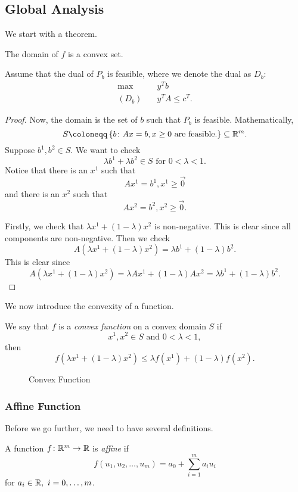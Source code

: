 \subsection{Global Analysis}
We start with a theorem.
\begin{theorem}
	The domain of \(f\) is a convex set.
\end{theorem}
Assume that the dual of \(P_b\) is feasible, where we denote the dual as \(D_b\):
\begin{align*}
	\max~      & y^{T}b            \\
	(D_b)\quad & y^{T}A\leq c^{T}.
\end{align*}

\begin{proof}
	Now, the domain is the set of \(b\) such that \(P_b\) is feasible. Mathematically,
	\[
		S\coloneqq \left\{ b\colon Ax = b, x\geq 0 \text{ are feasible.}\right\}\subseteq \mathbb{\MakeUppercase{R}}^m.
	\]
	Suppose \(b^1, b^2\in S\). We want to check
	\[
		\lambda b^{1}+\lambda b^2 \in S\text{ for }0<\lambda<1.
	\]
	Notice that there is an \(x^1\) such that
	\[
		Ax^1 = b^1, x^1\geq \vec{0}
	\]
	and there is an \(x^2\) such that
	\[
		Ax^2 = b^2, x^2\geq \vec{0}.
	\]

	Firstly, we check that \(\lambda x^{1}+(1 - \lambda)x^2\) is non-negative. This is clear since all components are non-negative. Then we check
	\[
		A(\lambda x^{1}+(1 - \lambda)x^2) = \lambda b^1 + (1 - \lambda)b^2.
	\]
	This is clear since
	\[
		A(\lambda x^{1}+(1 - \lambda)x^2) = \lambda Ax^1 + (1 - \lambda)Ax^2 = \lambda b^1 + (1-\lambda)b^2.
	\]
\end{proof}

We now introduce the convexity of a function.
\begin{definition}
	We say that \(f\) is a \emph{convex function} on a convex domain \(S\) if
	\[
		x^1, x^2\in S\text{ and }0<\lambda<1,
	\]
	then
	\[
		f(\lambda x^1+(1 - \lambda)x^2)\leq \lambda f(x^1)+(1-\lambda)f(x^2).
	\]
\end{definition}

\begin{figure}[H]
	\centering
	\caption{Convex Function}
	\label{fig:convex-function}
\end{figure}

\subsubsection{Affine Function}
Before we go further, we need to have several definitions.
\begin{definition}
	A function \(f\colon \mathbb{\MakeUppercase{R}}^{m}\to \mathbb{\MakeUppercase{R}}\) is \emph{affine} if
	\[
		f(u_1, u_2, \ldots , u_m) = a_0 + \sum\limits_{i=1}^{m} a_{i}u_{i}
	\]
	for \(a_i \in\mathbb{\MakeUppercase{R}},\ i = 0, \ldots , m\).
\end{definition}


